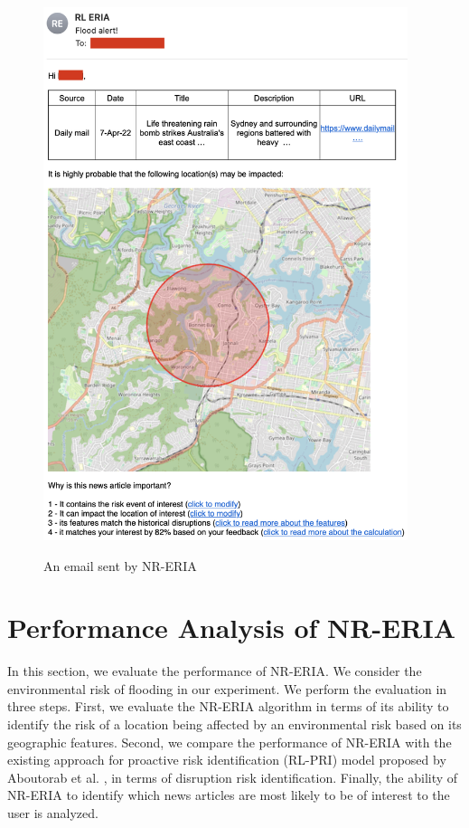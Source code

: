 \documentclass[
]{ceurart}
\begin{document}
\begin{figure}[hbt!]
  \begin{center}
  \includegraphics[width=4.2in]{photo/email.png}\\
  \caption{An email sent by NR-ERIA }\label{RL-ERIA email}
  \end{center}
  \vspace{-0.2in}
\end{figure}

\section{Performance Analysis of NR-ERIA}

In this section, we evaluate the performance of NR-ERIA. We consider the environmental risk of flooding in our experiment. We perform the evaluation in three steps. First, we evaluate the NR-ERIA algorithm in terms of its ability to identify the risk of a location being affected by an environmental risk based on its geographic features. 
Second, we compare the performance of NR-ERIA with the existing approach for proactive risk identification (RL-PRI) model proposed by Aboutorab et al. \cite{aboutorab2021reinforcement}, in terms of disruption risk identification. Finally, the ability of NR-ERIA to identify which news articles are most likely to be of interest to the user is analyzed.
\end{document}
